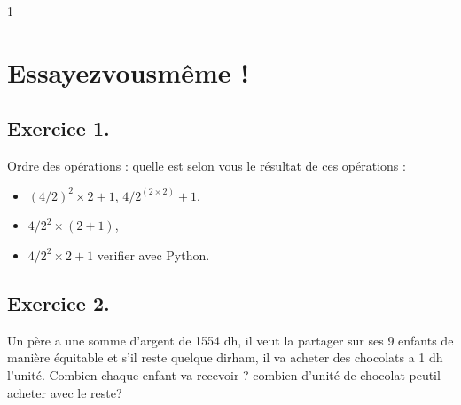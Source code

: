 \documentclass[letterpaper,10pt,french]{sphinxmanual}
\begin{document}
\begin{sphinxVerbatim}[commandchars=\\\{\}]
1
\end{sphinxVerbatim}


\section{Essayez\sphinxhyphen{}vous\sphinxhyphen{}même !}
\label{\detokenize{exo1:essayez-vous-meme}}\label{\detokenize{exo1::doc}}



\subsection{Exercice 1.}
\label{\detokenize{exo1:exercice-1}}
\sphinxAtStartPar
Ordre des opérations : quelle est selon vous le résultat de ces opérations :
\begin{itemize}
\item {} 
\sphinxAtStartPar
\((4/2)^2\times 2 + 1\), \(4/2^{(2\times 2)} + 1\),

\item {} 
\sphinxAtStartPar
\(4/2^2\times (2 + 1)\),

\item {} 
\sphinxAtStartPar
\(4/2^2\times 2 + 1\)
verifier avec Python.

\end{itemize}

\begin{sphinxVerbatim}[commandchars=\\\{\}]
\end{sphinxVerbatim}




\subsection{Exercice 2.}
\label{\detokenize{exo1:exercice-2}}
\sphinxAtStartPar
Un père a une somme d’argent de 1554 dh, il veut la partager sur ses 9 enfants de manière équitable et s’il reste quelque dirham, il va acheter des chocolats a 1 dh l’unité. Combien chaque enfant va recevoir ? combien d’unité de chocolat peut\sphinxhyphen{}il acheter avec le reste?

\begin{sphinxVerbatim}[commandchars=\\\{\}]
\end{sphinxVerbatim}
\end{document}
